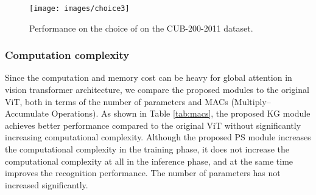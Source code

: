 \documentclass[5p,twocolumn]{elsarticle}
\begin{document}
\begin{figure}[h]
\centering
 \texttt{[image: images/choice3]}
  \caption{Performance on the choice of  on the CUB-200-2011 dataset.}
  \label{fig:choiceu}
\end{figure}


\subsubsection{\textbf{Computation complexity}}
Since the computation and memory cost can be heavy for global attention in vision transformer architecture, we compare the proposed modules to the original ViT, both in terms of the number of parameters and MACs (Multiply–Accumulate Operations). As shown in Table \ref{tab:macs}, the proposed KG module achieves better performance compared to the original ViT without significantly increasing computational complexity. Although the proposed PS module increases the computational complexity in the training phase, it does not increase the computational complexity at all in the inference phase, and at the same time improves the recognition performance. The number of parameters has not increased significantly.
\end{document}
